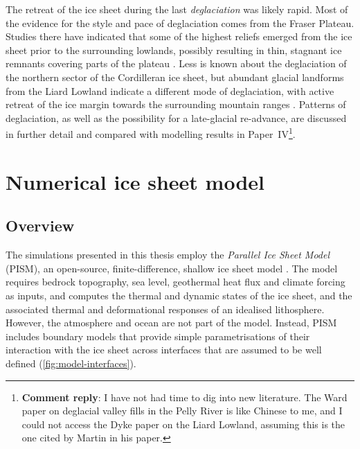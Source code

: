 \documentclass{article}
\newcommand{\renote}[1]{\footnote{\textbf{Comment reply}: #1}}
\newcommand{\CCYC}[0]{Paper~IV}     %
\begin{document}
The retreat of the ice sheet during the last \emph{deglaciation} was likely
rapid. Most of the evidence for the style and pace of deglaciation comes from
the Fraser Plateau. Studies there have indicated that some of the highest
reliefs emerged from the ice sheet prior to the surrounding lowlands, possibly
resulting in thin, stagnant ice remnants covering parts of the plateau
\citep{Fulton.1967, Fulton.1991, Margold.etal.2011, Margold.etal.2013a}. Less
is known about the deglaciation of the northern sector of the Cordilleran ice
sheet, but abundant glacial landforms from the Liard Lowland indicate a
different mode of deglaciation, with active retreat of the ice margin towards
the surrounding mountain ranges \citep{Margold.etal.2013}. Patterns of
deglaciation, as well as the possibility for a late-glacial re-advance, are
discussed in further detail and compared with modelling results in
\CCYC\renote{
    I have not had time to dig into new literature. The Ward paper on
    deglacial valley fills in the Pelly River is like Chinese to me, and I
    could not access the Dyke paper on the Liard Lowland, assuming this is the
    one cited by Martin in his paper.}.

\section{Numerical ice sheet model}

\subsection{Overview}

The simulations presented in this thesis employ the \emph{Parallel Ice Sheet
Model} (PISM), an open-source, finite-difference, shallow ice sheet model
\citep{PISM-authors.2014}. The model requires bedrock topography, sea level,
geothermal heat flux and climate forcing as inputs, and computes the thermal
and dynamic states of the ice sheet, and the associated thermal and
deformational responses of an idealised lithosphere. However, the atmosphere
and ocean are not part of the model. Instead, PISM includes boundary models
that provide simple parametrisations of their interaction with the ice sheet
across interfaces that are assumed to be well defined
(\cref{fig:model-interfaces}).
\end{document}
